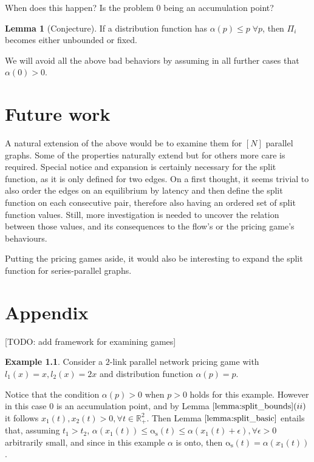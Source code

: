 \documentclass[10pt,a4paper]{book}
\newcommand{\as}{\mathrm{\alpha_s}}
\newcommand{\R}{\mathbb{R}}
\theoremstyle{definition}
\newtheorem{lemma}[definition]{Lemma}
\theoremstyle{comment}
\newtheorem{example}[definition]{Example}
\begin{document}
When does this happen?
Is the problem $0$ being an accumulation point?
\begin{lemma}[Conjecture]
	If a distribution function has $\alpha(p) \le p \; \forall p$, then $\Pi_i$ becomes either unbounded or fixed.
\end{lemma}

We will avoid all the above bad behaviors by assuming in all further cases that $\alpha(0) > 0$.

\cleardoublepage


\chapter{Future work}

A natural extension of the above would be to examine them for $[N]$ parallel graphs.
Some of the properties naturally extend but for others more care is required.
Special notice and expansion is certainly necessary for the split function, as it is only defined for two edges.
On a first thought, it seems trivial to also order the edges on an equilibrium by latency and then define the split function on each consecutive pair, therefore also having an ordered set of split function values.
Still, more investigation is needed to uncover the relation between those values, and its consequences to the flow's or the pricing game's behaviours.

Putting the pricing games aside, it would also be interesting to expand the split function for series-parallel graphs.

\cleardoublepage

{}


\cleardoublepage

{}
\chapter*{Appendix}

[TODO: add framework for examining games]

\begin{example}
	\label{example:ap_p}
	Consider a $2$-link parallel network pricing game with $l_1(x) = x, l_2(x) = 2x$ and distribution function $\alpha(p) = p$.
\end{example}

Notice that the condition $\alpha(p) > 0$ when $p > 0$ holds for this example.
However in this case $0$ is an accumulation point, and by Lemma $\ref{lemma:split_bounds}(ii)$ it follows $x_1(t), x_2(t) > 0, \forall t \in \R_+^2$.
Then Lemma $\ref{lemma:split_basic}$ entails that, assuming $t_1 > t_2$, $\alpha(x_1(t)) \le \as(t) \le \alpha(x_1(t) + \epsilon), \forall \epsilon > 0$ arbitrarily small, and since in this example $\alpha$ is onto, then $\as(t) = \alpha(x_1(t))$.
\end{document}
